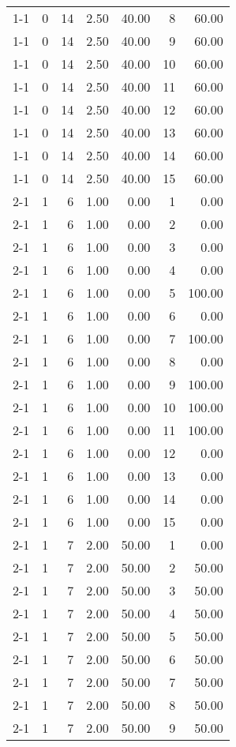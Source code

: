 \begin{tabular}{lrrrrrr}
1-1 & 0 & 14 & 2.50 & 40.00 & 8 & 60.00 \\
1-1 & 0 & 14 & 2.50 & 40.00 & 9 & 60.00 \\
1-1 & 0 & 14 & 2.50 & 40.00 & 10 & 60.00 \\
1-1 & 0 & 14 & 2.50 & 40.00 & 11 & 60.00 \\
1-1 & 0 & 14 & 2.50 & 40.00 & 12 & 60.00 \\
1-1 & 0 & 14 & 2.50 & 40.00 & 13 & 60.00 \\
1-1 & 0 & 14 & 2.50 & 40.00 & 14 & 60.00 \\
1-1 & 0 & 14 & 2.50 & 40.00 & 15 & 60.00 \\
2-1  & 1 & 6 & 1.00 & 0.00 & 1 & 0.00 \\
2-1  & 1 & 6 & 1.00 & 0.00 & 2 & 0.00 \\
2-1  & 1 & 6 & 1.00 & 0.00 & 3 & 0.00 \\
2-1  & 1 & 6 & 1.00 & 0.00 & 4 & 0.00 \\
2-1  & 1 & 6 & 1.00 & 0.00 & 5 & 100.00 \\
2-1  & 1 & 6 & 1.00 & 0.00 & 6 & 0.00 \\
2-1  & 1 & 6 & 1.00 & 0.00 & 7 & 100.00 \\
2-1  & 1 & 6 & 1.00 & 0.00 & 8 & 0.00 \\
2-1  & 1 & 6 & 1.00 & 0.00 & 9 & 100.00 \\
2-1  & 1 & 6 & 1.00 & 0.00 & 10 & 100.00 \\
2-1  & 1 & 6 & 1.00 & 0.00 & 11 & 100.00 \\
2-1  & 1 & 6 & 1.00 & 0.00 & 12 & 0.00 \\
2-1  & 1 & 6 & 1.00 & 0.00 & 13 & 0.00 \\
2-1  & 1 & 6 & 1.00 & 0.00 & 14 & 0.00 \\
2-1  & 1 & 6 & 1.00 & 0.00 & 15 & 0.00 \\
2-1  & 1 & 7 & 2.00 & 50.00 & 1 & 0.00 \\
2-1  & 1 & 7 & 2.00 & 50.00 & 2 & 50.00 \\
2-1  & 1 & 7 & 2.00 & 50.00 & 3 & 50.00 \\
2-1  & 1 & 7 & 2.00 & 50.00 & 4 & 50.00 \\
2-1  & 1 & 7 & 2.00 & 50.00 & 5 & 50.00 \\
2-1  & 1 & 7 & 2.00 & 50.00 & 6 & 50.00 \\
2-1  & 1 & 7 & 2.00 & 50.00 & 7 & 50.00 \\
2-1  & 1 & 7 & 2.00 & 50.00 & 8 & 50.00 \\
2-1  & 1 & 7 & 2.00 & 50.00 & 9 & 50.00 \\

\end{tabular}
